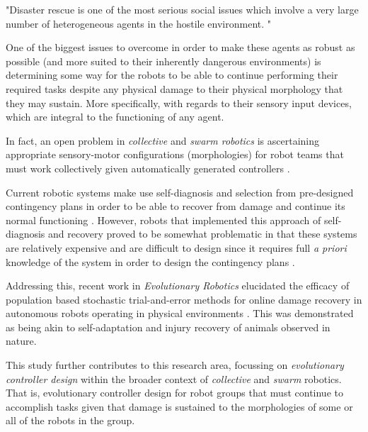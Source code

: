 "Disaster rescue is one of the most serious social issues which involve a very large number of heterogeneous agents in the hostile environment. "\cite{KitanoTadokoro1999}


One of the biggest issues to overcome in order to make these agents as robust as possible (and more suited to their inherently dangerous environments) is determining some way for the robots to be able to continue performing their required tasks despite any physical damage to their physical morphology that they may sustain. More specifically, with regards to their sensory input devices, which are integral to the functioning of any agent.

In fact, an open problem in \textit{collective} \cite{KubeZhang1994B} and \textit{swarm robotics} \cite{Beni2004}
is ascertaining appropriate sensory-motor configurations (morphologies) for robot teams that must work collectively given automatically generated controllers \cite{FloreanoDurrMattiussi2008}.

Current robotic systems make use self-diagnosis and selection from pre-designed contingency plans in order to be able to recover from damage and continue its normal functioning \cite{fenton2001fault, verma2004real, BongardZykovLipson2006}. However, robots that implemented this approach of self-diagnosis and recovery proved to be somewhat problematic in that these systems are relatively expensive and are difficult to design since it requires full \textit{a priori} knowledge of the system in order to design the contingency plans \cite{CullyCluneTaraporeMouret2015}.



Addressing this, recent work in \textit{Evolutionary Robotics} elucidated the efficacy of population based stochastic trial-and-error methods for online damage recovery in autonomous robots operating in physical environments \cite{CullyCluneTaraporeMouret2015}.
This was demonstrated as being akin to self-adaptation and injury recovery of animals observed in nature.

This study further contributes to this research area, focussing on \textit{evolutionary controller design} \cite{FloreanoDurrMattiussi2008} within the broader context of \textit{collective} \cite{KubeZhang1994B} and \textit{swarm} \cite{Beni2004} robotics.
That is, evolutionary controller design for robot groups that must continue to accomplish tasks given that damage is sustained to the morphologies of some or all of the robots in the group.

